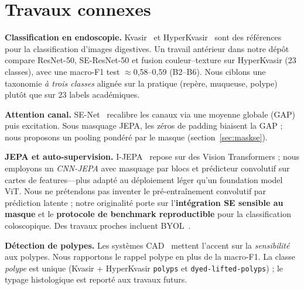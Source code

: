 \section{Travaux connexes}
\label{sec:related}

\textbf{Classification en endoscopie.}
Kvasir~\cite{pogorelov2017kvasir} et HyperKvasir~\cite{borgli2020hyperkvasir} sont des références pour la classification d'images digestives.
Un travail antérieur dans notre dépôt~\cite{assif2026endoscopy} compare ResNet-50, SE-ResNet-50 et fusion couleur--texture sur HyperKvasir (23 classes), avec une macro-F1 test $\approx$0,58--0,59 (B2--B6).
Nous ciblons une taxonomie \emph{à trois classes} alignée sur la pratique (repère, muqueuse, polype) plutôt que sur 23 labels académiques.

\textbf{Attention canal.}
SE-Net~\cite{hu2018senet} recalibre les canaux via une moyenne globale (GAP) puis excitation.
Sous masquage JEPA, les zéros de padding biaisent la GAP ; nous proposons un pooling pondéré par le masque (section~\ref{sec:maskse}).

\textbf{JEPA et auto-supervision.}
I-JEPA~\cite{assran2023ijepa} repose sur des Vision Transformers ; nous employons un \emph{CNN-JEPA} avec masquage par blocs et prédicteur convolutif sur cartes de features---plus adapté au déploiement léger qu'un foundation model ViT.
Nous ne prétendons pas inventer le pré-entraînement convolutif par prédiction latente ; notre originalité porte sur l'\textbf{intégration SE sensible au masque} et le \textbf{protocole de benchmark reproductible} pour la classification coloscopique.
Des travaux proches incluent BYOL~\cite{grill2020byol}.

\textbf{Détection de polypes.}
Les systèmes CAD~\cite{tajbakhsh2016cad} mettent l'accent sur la \emph{sensibilité} aux polypes.
Nous rapportons le rappel polype en plus de la macro-F1.
La classe \emph{polype} est unique (Kvasir + HyperKvasir \texttt{polyps} et \texttt{dyed-lifted-polyps}) ; le typage histologique est reporté aux travaux futurs.
